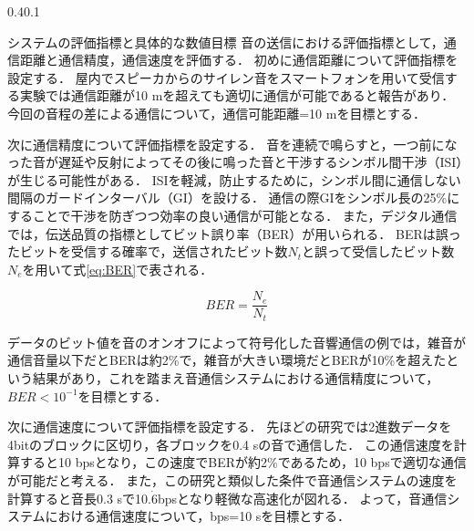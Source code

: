 \documentclass[a4j,11pt,dvipdfmx]{jsarticle}
\makeatletter
\renewcommand{\section}{%
    \@startsection{section}{1}{\z@}%
    {0.4\Cvs}{0.1\Cvs}%
    {\normalfont\headfont\raggedright}}
\makeatother
\begin{document}
\section{システムの評価指標と具体的な数値目標}\label{sec:evaluation}
音の送信における評価指標として，通信距離と通信精度，通信速度を評価する．
初めに通信距離について評価指標を設定する．
屋内でスピーカからのサイレン音をスマートフォンを用いて受信する実験では通信距離が10 mを超えても適切に通信が可能であると報告があり\cite{ref:tone}\cite{ref:tone2}．今回の音程の差による通信について，通信可能距離=10 mを目標とする．
\par
次に通信精度について評価指標を設定する．
音を連続で鳴らすと，一つ前になった音が遅延や反射によってその後に鳴った音と干渉するシンボル間干渉（ISI）が生じる可能性がある．
ISIを軽減，防止するために，シンボル間に通信しない間隔のガードインターバル（GI）を設ける．
通信の際GIをシンボル長の25\%にすることで干渉を防ぎつつ効率の良い通信が可能となる\cite{ref:GI}．
また，デジタル通信では，伝送品質の指標としてビット誤り率（BER）が用いられる\cite{ref:BER}．
BERは誤ったビットを受信する確率で，送信されたビット数$N_t$と誤って受信したビット数$N_e$を用いて式\ref{eq:BER}で表される．


\begin{equation}
  \label{eq:BER}
  BER = \frac{N_e}{N_t}
\end{equation}

データのビット値を音のオンオフによって符号化した音響通信の例では，雑音が通信音量以下だとBERは約2\%で，雑音が大きい環境だとBERが10\%を超えたという結果があり\cite{ref:mobile_sound}，これを踏まえ音通信システムにおける通信精度について，$BER<10^{-1}$を目標とする．
\par
次に通信速度について評価指標を設定する．
先ほどの研究\cite{ref:mobile_sound}では2進数データを4bitのブロックに区切り，各ブロックを0.4 sの音で通信した．
この通信速度を計算すると10 bpsとなり，この速度でBERが約2\%であるため，10 bpsで適切な通信が可能だと考える．
また，この研究と類似した条件で音通信システムの速度を計算すると音長0.3 sで10.$\dot{6}$bpsとなり軽微な高速化が図れる．
よって，音通信システムにおける通信速度について，bps=10 sを目標とする．
\end{document}
